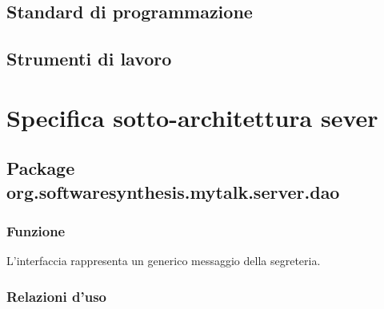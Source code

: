 \subsection{Standard di programmazione}

\subsection{Strumenti di lavoro}

\clearpage

\section{Specifica sotto-architettura sever}\label{sec:serverarchitecture}

\subsection{Package org.softwaresynthesis.mytalk.server.dao}\label{sec:dao}


\subsubsection*{Funzione}
L'interfaccia rappresenta un generico messaggio della segreteria.

\subsubsection*{Relazioni d'uso}

